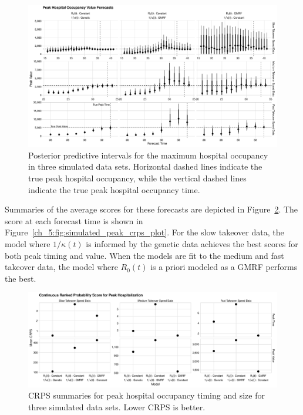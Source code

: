 \begin{figure}
    \centering
    \includegraphics[width=1.0\columnwidth]{simulated_peak_assessment_value_plot}
    \caption[Posterior predictive intervals for peak hospital occupancy for simulated data sets.]{Posterior predictive intervals for the maximum hospital occupancy in three simulated data sets.
    Horizontal dashed lines indicate the true peak hospital occupancy, while the vertical dashed lines indicate the true peak hospital occupancy time.}
    \label{ch_5:fig:simulated_peak_assessment_value_plot}
\end{figure}

Summaries of the average scores for these forecasts are depicted in Figure~\ref{ch_5:fig:simulated_peak_crps_dotplot_plot}.
The score at each forecast time is shown in Figure~\ref{ch_5:fig:simulated_peak_crps_plot}.
For the slow takeover data, the model where \( 1 / \kappa(t) \) is informed by the genetic data achieves the best scores for both peak timing and value.
When the models are fit to the medium and fast takeover data, the model where \( R_0(t) \) is a priori modeled as a GMRF performs the best.

\begin{figure}
    \centering
    \includegraphics[width=1.0\columnwidth]{simulated_peak_crps_dotplot_plot}
    \caption[CRPS summaries for peak hospital occupancy in simulated data sets.]{CRPS summaries for peak hospital occupancy timing and size for three simulated data sets. Lower CRPS is better.}
    \label{ch_5:fig:simulated_peak_crps_dotplot_plot}
\end{figure}

